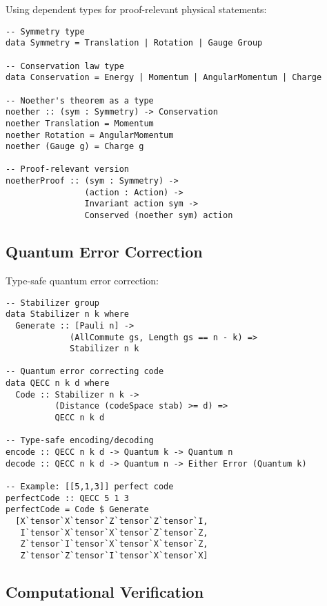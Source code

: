 Using dependent types for proof-relevant physical statements:

\begin{example}
\begin{verbatim}
-- Symmetry type
data Symmetry = Translation | Rotation | Gauge Group

-- Conservation law type  
data Conservation = Energy | Momentum | AngularMomentum | Charge

-- Noether's theorem as a type
noether :: (sym : Symmetry) -> Conservation
noether Translation = Momentum
noether Rotation = AngularMomentum
noether (Gauge g) = Charge g

-- Proof-relevant version
noetherProof :: (sym : Symmetry) -> 
                (action : Action) ->
                Invariant action sym ->
                Conserved (noether sym) action
\end{verbatim}
\end{example}

\subsection{Quantum Error Correction}

Type-safe quantum error correction:

\begin{example}
\begin{verbatim}
-- Stabilizer group
data Stabilizer n k where
  Generate :: [Pauli n] -> 
             (AllCommute gs, Length gs == n - k) =>
             Stabilizer n k

-- Quantum error correcting code
data QECC n k d where
  Code :: Stabilizer n k ->
          (Distance (codeSpace stab) >= d) =>
          QECC n k d

-- Type-safe encoding/decoding
encode :: QECC n k d -> Quantum k -> Quantum n
decode :: QECC n k d -> Quantum n -> Either Error (Quantum k)

-- Example: [[5,1,3]] perfect code
perfectCode :: QECC 5 1 3
perfectCode = Code $ Generate 
  [X`tensor`X`tensor`Z`tensor`Z`tensor`I, 
   I`tensor`X`tensor`X`tensor`Z`tensor`Z, 
   Z`tensor`I`tensor`X`tensor`X`tensor`Z, 
   Z`tensor`Z`tensor`I`tensor`X`tensor`X]
\end{verbatim}
\end{example}

\subsection{Computational Verification}

